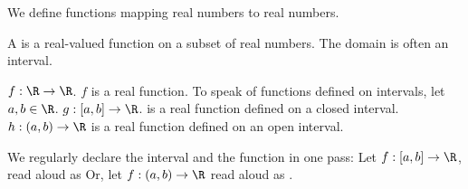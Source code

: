 
\sbasic

















\sstart
{}


We define functions mapping
real numbers to real numbers.


A
is a real-valued function
on
a subset of real numbers.
The domain
is often an
interval.


$f: \R \to \R$. $f$ is a real
function.
To speak of functions defined
on intervals,
let $a, b \in \R$.
$g: [a, b] \to \R$.
is a real function
defined on a closed interval.
$h: (a, b) \to \R$
is a real function
defined on an open interval.

We regularly declare the interval
and the function in one pass:
Let $f: [a, b] \to \R$, read
aloud as 
Or, let $f: (a, b) \to \R$
read aloud as
.
\strats
